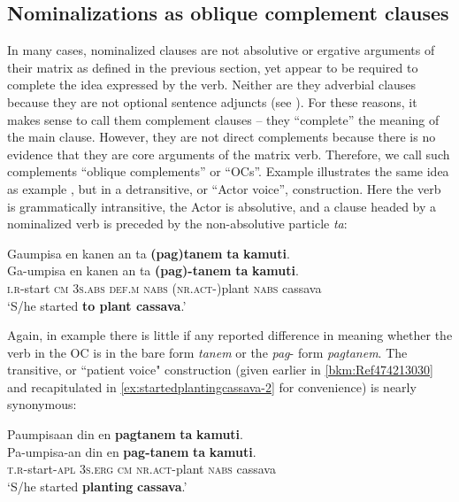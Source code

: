 \subsection{Nominalizations as oblique complement clauses}
\label{sec:nominalizationsasobliquecomplementclauses}
In many cases, nominalized clauses are not absolutive or ergative arguments of their matrix as defined in the previous section, yet appear to be required to complete the idea expressed by the verb. Neither are they adverbial clauses because they are not optional sentence adjuncts (see ). For these reasons, it makes sense to call them complement clauses – they “complete” the meaning of the main clause. However, they are not direct complements because there is no evidence that they are core arguments of the matrix verb. Therefore, we call such complements “oblique complements” or “OCs”. Example  illustrates the same idea as example , but in a detransitive, or “Actor voice”, construction. Here the verb is grammatically intransitive, the Actor is absolutive, and a clause headed by a nominalized verb is preceded by the non-absolutive particle \textit{ta}:

\ea
\label{bkm:Ref462325755}
Gaumpisa  en  kanen  an    ta  \textbf{(pag)}\textbf{tanem}  \textbf{ta}  \textbf{kamuti}. \smallskip\\
\gll Ga-umpisa  en  kanen  an    ta  \textbf{(pag)-tanem}  \textbf{ta}  \textbf{kamuti}. \\
\textsc{i.r}-start  \textsc{cm}  3\textsc{s.abs}  \textsc{def.m}  \textsc{nabs}  (\textsc{nr.act}-)plant  \textsc{nabs}  cassava \\
\glt ‘S/he started \textbf{to plant cassava}.’
\z

Again, in example  there is little if any reported difference in meaning whether the verb in the OC is in the bare form \textit{tanem} or the \textit{pag}- form \textit{pagtanem}. The transitive, or ``patient voice" construction (given earlier in \ref{bkm:Ref474213030} and recapitulated in \ref{ex:startedplantingcassava-2} for convenience) is nearly synonymous:

\ea
\label{ex:startedplantingcassava-2}
Paumpisaan  din  en  \textbf{pagtanem}  \textbf{ta}  \textbf{kamuti}. \smallskip\\
\gll Pa-umpisa-an  din  en  \textbf{pag-tanem}  \textbf{ta}  \textbf{kamuti}. \\
\textsc{t.r}-start-\textsc{apl}  3\textsc{s.erg}  \textsc{cm}  \textsc{nr.act}-plant  \textsc{nabs}  cassava \\
\glt ‘S/he started \textbf{planting} \textbf{cassava}.’
\z


